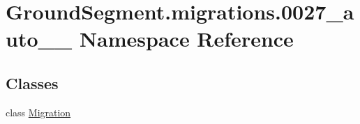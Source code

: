 \hypertarget{namespace_ground_segment_1_1migrations_1_10027__auto__20170115__1508}{}\section{Ground\+Segment.\+migrations.0027\+\_\+auto\+\_\+\_ Namespace Reference}
\label{namespace_ground_segment_1_1migrations_1_10027__auto__20170115__1508}
\subsection*{Classes}
\begin{DoxyCompactItemize}
\item 
class \hyperlink{class_ground_segment_1_1migrations_1_10027__auto__20170115__1508_1_1_migration}{Migration}
\end{DoxyCompactItemize}
